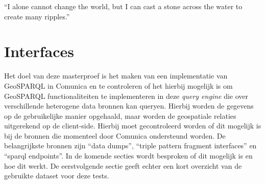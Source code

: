 \begin{savequote}[0.55\linewidth]
	``I alone cannot change the world, but I can cast a stone across the water to create many ripples.''
\end{savequote}

\chapter{Interfaces}
\label{chap:interfaces}
Het doel van deze masterproef is het maken van een implementatie van GeoSPARQL in Comunica en te controleren of het hierbij mogelijk is om GeoSPARQL functionaliteiten te implementeren in deze \textit{query engine} die over verschillende heterogene data bronnen kan queryen. Hierbij worden de gegevens op de gebruikelijke manier opgehaald, maar worden de geospatiale relaties uitgerekend op de client-side. Hierbij moet gecontroleerd worden of dit mogelijk is bij de bronnen die momenteel door Comunica ondersteund worden. De belangrijkste bronnen zijn ``data dumps'', ``triple pattern fragment interfaces'' en ``sparql endpoints''. In de komende secties wordt besproken of dit mogelijk is en hoe dit werkt. De eerstvolgende sectie geeft echter een kort overzicht van de gebruikte dataset voor deze tests.

 
\newpage
 
\newpage
 
\newpage
 
\newpage
